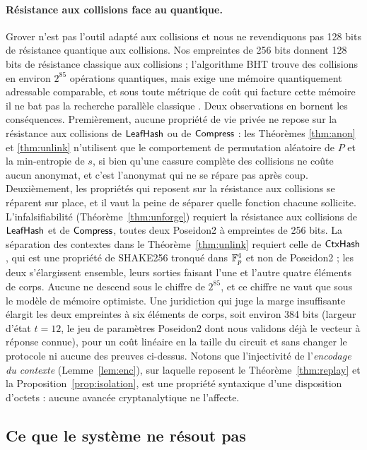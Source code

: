 \documentclass[11pt]{article}
\theoremstyle{definition}
\begin{document}
\paragraph{Résistance aux collisions face au quantique.} Grover n'est pas l'outil adapté
aux collisions et nous ne revendiquons pas 128 bits de résistance quantique aux
collisions. Nos empreintes de 256 bits donnent 128 bits de résistance classique aux
collisions ; l'algorithme BHT \cite{bht} trouve des collisions en environ $2^{85}$
opérations quantiques, mais exige une mémoire quantiquement adressable comparable, et sous
toute métrique de coût qui facture cette mémoire il ne bat pas la recherche parallèle
classique \cite{bernsteincoll}. Deux observations en bornent les conséquences.
Premièrement, aucune propriété de vie privée ne repose sur la résistance aux collisions de
$\mathsf{LeafHash}$ ou de $\mathsf{Compress}$ : les Théorèmes \ref{thm:anon} et \ref{thm:unlink}
n'utilisent que le comportement de permutation aléatoire de $P$ et la min-entropie de $s$,
si bien qu'une cassure complète des collisions ne coûte aucun anonymat, et c'est l'anonymat
qui ne se répare pas après coup. Deuxièmement, les propriétés qui reposent sur la
résistance aux collisions se réparent sur place, et il vaut la peine de séparer quelle
fonction chacune sollicite. L'infalsifiabilité (Théorème~\ref{thm:unforge}) requiert la
résistance aux collisions de $\mathsf{LeafHash}$ et de $\mathsf{Compress}$, toutes deux Poseidon2 à
empreintes de 256 bits. La séparation des contextes dans le Théorème~\ref{thm:unlink}
requiert celle de $\mathsf{CtxHash}$, qui est une propriété de SHAKE256 tronqué dans $\mathbb{F}_p^4$ et
non de Poseidon2 ; les deux s'élargissent ensemble, leurs sorties faisant l'une et l'autre
quatre éléments de corps. Aucune ne descend sous le chiffre de $2^{85}$, et ce chiffre ne
vaut que sous le modèle de mémoire optimiste. Une juridiction qui juge la marge
insuffisante élargit les deux empreintes à six éléments de corps, soit environ 384 bits
(largeur d'état $t = 12$, le jeu de paramètres Poseidon2 dont nous validons déjà le
vecteur à réponse connue), pour un coût linéaire en la taille du circuit et sans changer
le protocole ni aucune des preuves ci-dessus. Notons que l'injectivité de l'\emph{encodage
du contexte} (Lemme~\ref{lem:enc}), sur laquelle reposent le Théorème~\ref{thm:replay} et
la Proposition~\ref{prop:isolation}, est une propriété syntaxique d'une disposition
d'octets : aucune avancée cryptanalytique ne l'affecte.

\subsection{Ce que le système ne résout pas}
\label{sec:limits}
\end{document}
